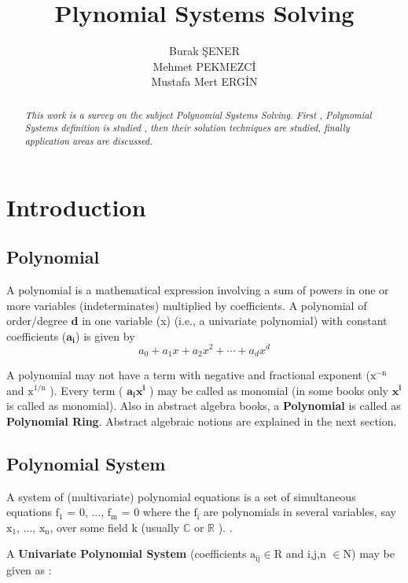 \documentclass[11pt]{article}
\title{\textbf{Plynomial Systems Solving}}
\author{Burak ŞENER\\
        Mehmet PEKMEZCİ\\
		Mustafa Mert ERGİN
		}
\date{}
\begin{document}
\maketitle
\begin{abstract}
\emph{This work is a survey on the subject Polynomial Systems Solving. First , Polynomial Systems definition is studied , then their solution techniques are studied, finally application areas are discussed. }
\end{abstract}

\section{Introduction}

\subsection{Polynomial}
 A polynomial is a mathematical expression involving a sum of powers in one or more variables (indeterminates) multiplied by coefficients. A polynomial of order/degree $\mathbf{d}$  in one variable (x)  (i.e., a univariate polynomial) with constant coefficients ($\mathbf{a_i}$) is given by \cite{wolframPolynomial}
\begin{equation}
    a_{0}+a_{1}x+a_{2}{x}^2+\cdots+a_{d}{x}^d 
\end{equation}

A polynomial may not have a term with negative and fractional exponent ($\mathrm{x^{-n}}$ and $\mathrm{x^{1/n}}$ ). Every term ( $\mathbf{a_ix^i}$ ) may be called as monomial (in some books only $\mathbf{x^i}$ is called as monomial). Also in abstract algebra books,  a \textbf{Polynomial} is called as \textbf{Polynomial Ring}. Abstract algebraic notions are explained in the next section.

\subsection{Polynomial System}

A system of (multivariate) polynomial equations is a set of simultaneous equations $\mathrm{f_{1}}$  = 0, ..., $\mathrm{f_{m}}$ = 0 where the $\mathrm{f_{i}}$ are polynomials in several variables, say $\mathrm{x_{1}}$, ..., $\mathrm{x_{n}}$, over some field k (usually $\mathbb{C}$ or $\mathbb{R}$ ). \cite{wikipediaSystemofPolynomialEquations}. 

A \textbf{Univariate Polynomial System}  (coefficients  $\mathrm{a_{ij} \in R}$  and i,j,n $\mathrm{\in N}$) may be given as : 
\end{document}
